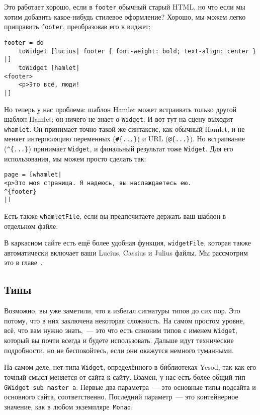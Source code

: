 Это работает хорошо, если в \lstinline'footer' обычный старый HTML, но что если
мы хотим добавить какое-нибудь стилевое оформление? Хорошо, мы можем легко
приправить \lstinline'footer', преобразовав его в виджет:
\begin{lstlisting}
footer = do
    toWidget [lucius| footer { font-weight: bold; text-align: center } |]
    toWidget [hamlet|
<footer>
    <p>Это всё, люди!
|]
\end{lstlisting}

Но теперь у нас проблема: шаблон Hamlet может встраивать только другой шаблон
Hamlet; он ничего не знает о \lstinline'Widget'. И вот тут на сцену выходит
\lstinline'whamlet'. Он принимает точно такой же синтаксис, как обычный Hamlet,
и не меняет интерполяцию переменных (\lstinline'#{...}')  и URL
(\lstinline'@{...}'). Но встраивание (\lstinline'^{...}') принимает
\lstinline'Widget', и финальный результат тоже \lstinline'Widget'. Для его
использования, мы можем просто сделать так:
\begin{lstlisting}
page = [whamlet|
<p>Это моя страница. Я надеюсь, вы наслаждаетесь ею.
^{footer}
|]
\end{lstlisting}

Есть также \lstinline'whamletFile', если вы предпочитаете держать ваш шаблон в
отдельном файле.

\begin{remark}
    В каркасном сайте есть ещё более удобная функция, \lstinline'widgetFile',
    которая также автоматически включает ваши Lucius, Cassius и Julius файлы.
    Мы рассмотрим это в главе~.
\end{remark}

\subsection{Типы}
Возможно, вы уже заметили, что я избегал сигнатуры типов до сих пор. Это
потому, что в них заключена некоторая сложность. На самом простом уровне, всё,
что вам нужно знать,~--- это что есть синоним типов с именем
\lstinline'Widget', который вы почти всегда и будете использовать. Дальше идут
технические подробности, но не беспокойтесь, если они окажутся немного
туманными.

На самом деле, нет типа \lstinline'Widget', определённого в библиотеках Yesod,
так как его точный смысл меняется от сайта к сайту. Взамен, у нас есть более
общий тип \lstinline'GWidget sub master a'. Первые два параметра~--- это
основные типы подсайта и основного сайта, соответственно. Последний параметр~---
это контейнерное значение, как в любом экземпляре~\lstinline'Monad'.

